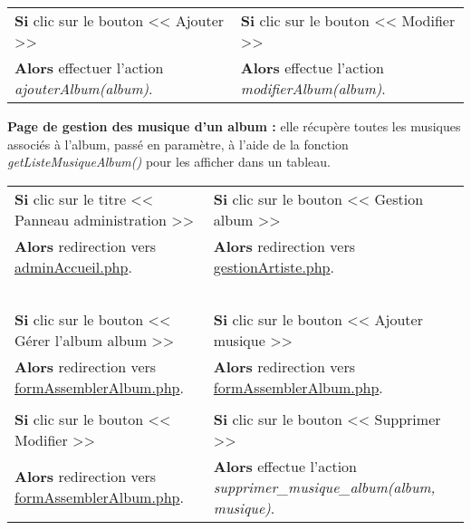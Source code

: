             \begin{center}
                \begin{tabular}{l | l}
                    \textbf{Si} clic sur le bouton << Ajouter >> & \textbf{Si} clic sur le bouton << Modifier >> \\
                    \textbf{Alors} effectuer l'action \emph{ajouterAlbum(album)}. & \textbf{Alors} effectue l'action \emph{modifierAlbum(album)}.
                \end{tabular}
            \end{center}
            
            
        \newpage
            
            \begin{paragraphe}
                \textbf{Page de gestion des musique d'un album :} elle récupère toutes les musiques associés à l'album, passé en paramètre, à l'aide de la fonction \emph{getListeMusiqueAlbum()} pour les afficher dans un tableau.
            \end{paragraphe}

            \begin{center}
                \begin{tabular}{l | l}
                    \textbf{Si} clic sur le titre << Panneau administration >> & \textbf{Si} clic sur le bouton << Gestion album >> \\
                    \textbf{Alors} redirection vers \underline{adminAccueil.php}. & \textbf{Alors} redirection vers \underline{gestionArtiste.php}. \\ \\

                    \textbf{Si} clic sur le bouton << Gérer l'album album >> & \textbf{Si} clic sur le bouton << Ajouter musique >> \\
                    \textbf{Alors} redirection vers \underline{formAssemblerAlbum.php}. & \textbf{Alors} redirection vers \underline{formAssemblerAlbum.php}. \\ \\
                    
                    \textbf{Si} clic sur le bouton << Modifier >> & \textbf{Si} clic sur le bouton << Supprimer >> \\
                    \textbf{Alors} redirection vers \underline{formAssemblerAlbum.php}. & \textbf{Alors} effectue l'action \emph{supprimer\_musique\_album(album, musique)}.
                \end{tabular}
            \end{center}
            
